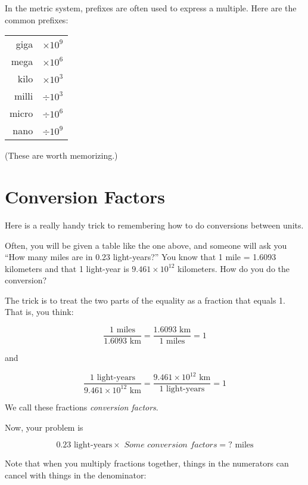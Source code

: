 In the metric system, prefixes are often used to express a multiple. Here are the common prefixes:

\begin{mdframed}[style=important, frametitle={Common Prefixes for Metric Units}]

\begin{tabular}{r | l}
giga  & $\times 10^{9}$\\
mega  & $\times 10^{6}$\\
kilo  & $\times 10^{3}$\\
milli  & $\div 10^{3}$\\
micro  & $\div 10^{6}$\\
nano  & $\div 10^{9}$\\
\end{tabular}

(These are worth memorizing.)
\end{mdframed}

\section{Conversion Factors}

Here is a really handy trick to remembering how to do conversions
between units.

Often, you will be given a table like the one above, and someone will ask you
``How many miles are in 0.23 light-years?''  You know that 1 mile = 1.6093
kilometers and that 1 light-year is $9.461 \times 10^{12}$ kilometers.
How do you do the conversion?

The trick is to treat the two parts of the equality as a fraction that equals 1.  That is, you think:

$$\frac{1 \text{ miles}}{1.6093 \text{ km}} = \frac{1.6093 \text{ km}}{1 \text{ miles}} = 1$$

and

$$\frac{1 \text{ light-years}}{9.461 \times 10^{12} \text{ km}} = \frac{9.461 \times 10^{12} \text{ km}}{1 \text{ light-years}} = 1$$

We call these fractions \textit{conversion factors}.

Now, your problem is

$$0.23 \text{ light-years} \times \textit{ Some conversion factors} = ? \text{ miles}$$

Note that when you multiply fractions together, things in the numerators can cancel with things in the denominator:


